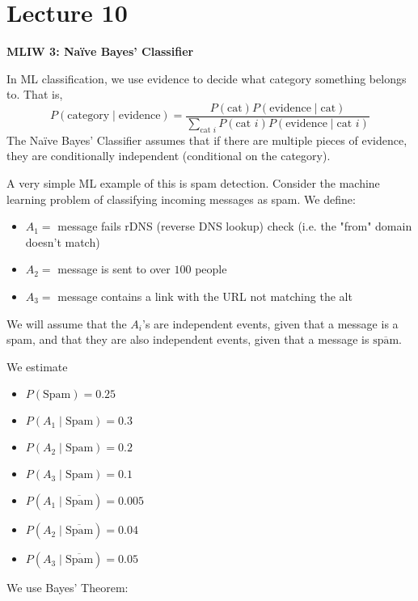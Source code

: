 \section{Lecture 10}
\textbf{MLIW 3: Naïve Bayes' Classifier}

In ML classification, we use evidence to decide what category something
belongs to. That is,
\[ P(\text{category}\mid\text{evidence})
=\frac{P(\text{cat})P(\text{evidence}\mid\text{cat})}
{\sum\limits_{\text{cat }i} P(\text{cat }i)P(\text{evidence}\mid\text{cat }i)} \]
The Naïve Bayes' Classifier  assumes that if there are multiple pieces of evidence,
they are conditionally independent (conditional on the category).

A very simple ML example of this is spam detection. Consider the machine
learning problem of classifying incoming messages as spam. We define:
\begin{itemize}
    \item $ A_1= $ message fails rDNS (reverse DNS lookup) check (i.e. the "from" domain doesn't match)
    \item $ A_2= $ message is sent to over $ 100 $ people
    \item $ A_3= $ message contains a link with the URL not matching the alt 
\end{itemize}

We will assume that the $ A_i $'s are independent events, given that a message
is a spam, and that they are also independent events, given that a message is
$ \overline{\text{spam}} $.

We estimate
\begin{itemize}
    \item $ P(\text{Spam})=0.25 $
    \item $ P(A_1\mid \text{Spam})=0.3$
    \item $ P(A_2\mid \text{Spam})=0.2$
    \item $ P(A_3\mid \text{Spam})=0.1$
    \item $ P(A_1\mid \overline{\text{Spam}})=0.005$
    \item $ P(A_2\mid \overline{\text{Spam}})=0.04$
    \item $ P(A_3\mid \overline{\text{Spam}})=0.05$
\end{itemize}
We use Bayes' Theorem:


